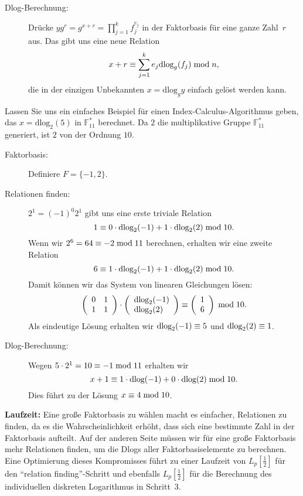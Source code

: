 \begin{refsegment}
\begin{description}
\item[Dlog-Berechnung:] Drücke $yg^r = g^{x+r} = \prod_{j=1}^k f_j^{e_j}$ in der Faktorbasis für eine ganze Zahl~$r$ aus.
Das gibt uns eine neue Relation
$$
  x+r \equiv \sum_{j=1}^k e_{j}\textrm{dlog}_g(f_j) \hspace{1mm}{\rm mod}\hspace{1mm} n,
$$
die in der einzigen Unbekannten $x=\textrm{dlog}_g y$ einfach gelöst werden kann.
\end{description}

Lassen Sie uns ein einfaches Beispiel für einen Index-Calculus-Algorithmus geben, das $x=\textrm{dlog}_2(5)$ in $\mathbb{F}_{11}^*$ berechnet. Da $2$ die multiplikative Gruppe $\mathbb{F}_{11}^*$ generiert, ist $2$ von der Ordnung $10$.

\begin{description}
\item[Faktorbasis:] Definiere $F=\{-1,2\}$.

\item[Relationen finden:] $2^1 = (-1)^0 2^1$ gibt uns eine erste triviale Relation
$$
  1 \equiv 0 \cdot \textrm{dlog}_2(-1) + 1\cdot \textrm{dlog}_2(2) \hspace{1mm}{\rm mod}\hspace{1mm} 10.
$$
Wenn wir $2^6 = 64 \equiv -2 \hspace{1mm}{\rm mod}\hspace{1mm} 11$ berechnen, erhalten wir eine zweite Relation
$$
  6 \equiv 1\cdot \textrm{dlog}_2(-1) + 1 \cdot \textrm{dlog}_2(2) \hspace{1mm}{\rm mod}\hspace{1mm} 10.
$$
Damit können wir das System von linearen Gleichungen lösen:
$$
\left(
\begin{array}{ll}
0 & 1\\
1 & 1
\end{array}
\right)
\cdot
\left(
\begin{array}{l}
\dlog_2(-1)\\
\dlog_2(2)
\end{array}
\right)
%
\equiv
%
\left(
\begin{array}{l}
1\\
6
\end{array}
\right) \mmod 10.
$$
Als eindeutige Lösung erhalten wir $\textrm{dlog}_2(-1) \equiv 5$ und $\textrm{dlog}_2(2) \equiv 1$.

\item[Dlog-Berechnung:] Wegen $5 \cdot 2^{1} = 10 \equiv -1 \hspace{1mm}{\rm mod}\hspace{1mm} 11$ erhalten wir
$$
  x + 1 \equiv 1 \cdot \textrm{dlog}(-1) + 0 \cdot \textrm{dlog}(2) \hspace{1mm}{\rm mod}\hspace{1mm} 10.
$$
Dies führt zu der Lösung $x \equiv 4 \hspace{1mm}{\rm mod}\hspace{1mm} 10$.
\end{description}

\textbf{Laufzeit:}
Eine große Faktorbasis zu wählen macht es einfacher, Relationen zu finden, da es die Wahrscheinlichkeit erhöht, dass sich eine bestimmte Zahl in der Faktorbasis aufteilt. Auf der anderen Seite müssen wir für eine große Faktorbasis mehr Relationen finden, um die Dlogs aller Faktorbasiselemente zu berechnen. Eine Optimierung dieses Kompromisses führt zu einer Laufzeit von $L_p[\frac 1 2]$ für den "`relation finding"'-Schritt und ebenfalls $L_p[\frac 1 2]$ für die Berechnung des individuellen diskreten Logarithmus in Schritt~3.


\end{refsegment}
